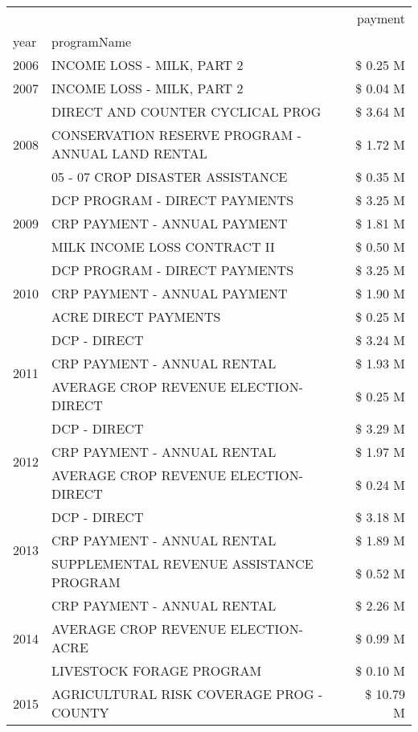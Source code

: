 \begin{tabular}{llr}
\toprule
 &  & payment \\
year & programName &  \\
\midrule
2006 & INCOME LOSS - MILK, PART 2 & \$ 0.25 M \\
\cline{1-3}
2007 & INCOME LOSS - MILK, PART 2 & \$ 0.04 M \\
\cline{1-3}
\multirow[t]{3}{*}{2008} & DIRECT AND COUNTER CYCLICAL PROG & \$ 3.64 M \\
 & CONSERVATION RESERVE PROGRAM - ANNUAL LAND RENTAL & \$ 1.72 M \\
 & 05 - 07 CROP DISASTER ASSISTANCE & \$ 0.35 M \\
\cline{1-3}
\multirow[t]{3}{*}{2009} & DCP PROGRAM - DIRECT PAYMENTS & \$ 3.25 M \\
 & CRP PAYMENT - ANNUAL PAYMENT & \$ 1.81 M \\
 & MILK INCOME LOSS CONTRACT II & \$ 0.50 M \\
\cline{1-3}
\multirow[t]{3}{*}{2010} & DCP PROGRAM - DIRECT PAYMENTS & \$ 3.25 M \\
 & CRP PAYMENT - ANNUAL PAYMENT & \$ 1.90 M \\
 & ACRE DIRECT PAYMENTS & \$ 0.25 M \\
\cline{1-3}
\multirow[t]{3}{*}{2011} & DCP - DIRECT & \$ 3.24 M \\
 & CRP PAYMENT - ANNUAL RENTAL & \$ 1.93 M \\
 & AVERAGE CROP REVENUE ELECTION-DIRECT & \$ 0.25 M \\
\cline{1-3}
\multirow[t]{3}{*}{2012} & DCP - DIRECT & \$ 3.29 M \\
 & CRP PAYMENT - ANNUAL RENTAL & \$ 1.97 M \\
 & AVERAGE CROP REVENUE ELECTION-DIRECT & \$ 0.24 M \\
\cline{1-3}
\multirow[t]{3}{*}{2013} & DCP - DIRECT & \$ 3.18 M \\
 & CRP PAYMENT - ANNUAL RENTAL & \$ 1.89 M \\
 & SUPPLEMENTAL REVENUE ASSISTANCE PROGRAM & \$ 0.52 M \\
\cline{1-3}
\multirow[t]{3}{*}{2014} & CRP PAYMENT - ANNUAL RENTAL & \$ 2.26 M \\
 & AVERAGE CROP REVENUE ELECTION-ACRE & \$ 0.99 M \\
 & LIVESTOCK FORAGE PROGRAM & \$ 0.10 M \\
\cline{1-3}
\multirow[t]{3}{*}{2015} & AGRICULTURAL RISK COVERAGE PROG - COUNTY & \$ 10.79 M \\

\end{tabular}
